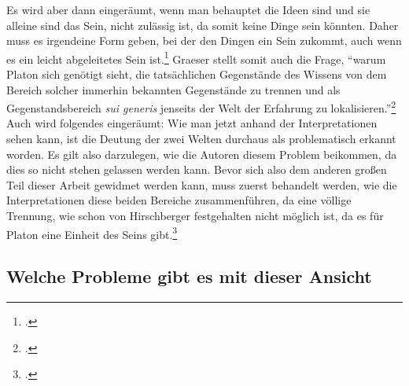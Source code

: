{\color{red}Es wird aber dann eingeräumt, wenn man behauptet die Ideen sind und sie alleine sind das Sein, nicht zulässig ist, da somit keine Dinge sein könnten. Daher muss es irgendeine Form geben, bei der den Dingen ein Sein zukommt, auch wenn es ein leicht abgeleitetes Sein ist.\footcite[vgl.][S. 131]{Martin73}}
Graeser stellt somit auch die Frage, \enquote{warum Platon sich genötigt sieht, die tatsächlichen Gegenstände des Wissens von dem Bereich solcher immerhin bekannten Gegenstände zu trennen und als Gegenstandsbereich \emph{sui generis} jenseits der Welt der Erfahrung zu lokalisieren.}\footcite[][S. 135]{GraeserPhiloGeschichte}
Auch wird folgendes eingeräumt: 
Wie man jetzt anhand der Interpretationen sehen kann, ist die Deutung der zwei Welten durchaus als problematisch erkannt worden. Es gilt also darzulegen, wie die Autoren diesem Problem beikommen, da dies so nicht stehen gelassen werden kann. 
Bevor sich also dem anderen großen Teil dieser Arbeit gewidmet werden kann, muss zuerst behandelt werden, wie die Interpretationen diese beiden Bereiche zusammenführen, da eine völlige Trennung, wie schon von Hirschberger festgehalten nicht möglich ist, da es für Platon eine Einheit des Seins gibt.\footcite[vgl][S. 100]{Hirschberger}

\subsection{Welche Probleme gibt es mit dieser Ansicht}
